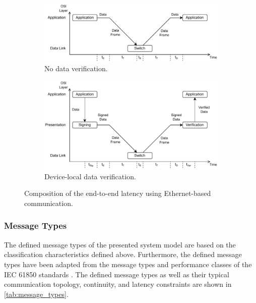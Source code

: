 \begin{figure}
    \centering
    \begin{subfigure}[t]{0.85\linewidth}
        \centering
        \includegraphics[width=\linewidth]{figures/frame_delivery_time_without_signature.drawio.pdf}
        \caption{No data verification.}
        \label{fig:frame_delivery_time_composition:unverified}
        \vspace{1.0\baselineskip}
    \end{subfigure}
    \begin{subfigure}[t]{0.85\linewidth}
        \centering
        \includegraphics[width=\linewidth]{figures/frame_delivery_time_with_signature.drawio.pdf}
        \caption{Device-local data verification.}
        \label{fig:frame_delivery_time_composition:verified}
    \end{subfigure}
    \caption{Composition of the end-to-end latency using Ethernet-based communication.}
    \label{fig:frame_delivery_time_composition}
\end{figure}

\subsubsection{Message Types}
\label{sec:approach:system_model:communication:message_types}
The defined message types of the presented system model are based on the classification characteristics defined above.
Furthermore, the defined message types have been adapted from the message types and performance classes of the IEC 61850 standards \cite{IEC61850P5}.
The defined message types as well as their typical communication topology, continuity, and latency constraints are shown in \autoref{tab:message_types}.


